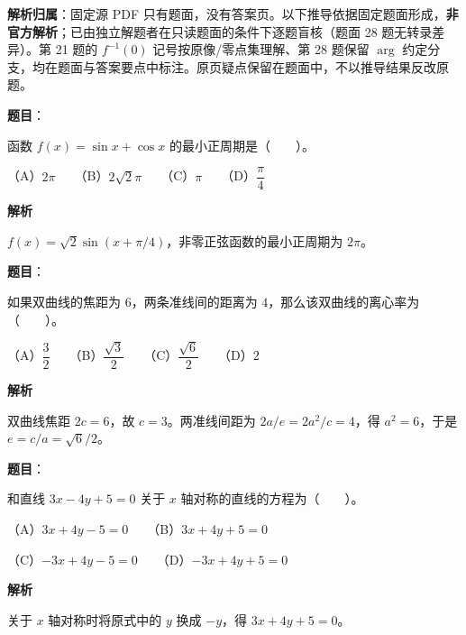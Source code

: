 

\begin{gknotice}
\textbf{解析归属}：固定源 PDF 只有题面，没有答案页。以下推导依据固定题面形成，\textbf{非官方解析}；已由独立解题者在只读题面的条件下逐题盲核（题面 28 题无转录差异）。第 21 题的 \(f^{-1}(0)\) 记号按原像/零点集理解、第 28 题保留 \(\arg\) 约定分支，均在题面与答案要点中标注。原页疑点保留在题面中，不以推导结果反改原题。
\end{gknotice}

\begin{answer}

\textbf{题目}：

函数 $f(x)=\sin x+\cos x$ 的最小正周期是\mbox{（　　）}。

（A）$2\pi$　　（B）$2\sqrt2\pi$　　（C）$\pi$　　（D）$\dfrac\pi4$

\textbf{解析}

$f(x)=\sqrt2\sin(x+\pi/4)$，非零正弦函数的最小正周期为 $2\pi$。


\end{answer}
\begin{answer}

\textbf{题目}：

如果双曲线的焦距为 $6$，两条准线间的距离为 $4$，那么该双曲线的离心率为\mbox{（　　）}。

（A）$\dfrac32$　　（B）$\dfrac{\sqrt3}{2}$　　（C）$\dfrac{\sqrt6}{2}$　　（D）$2$

\textbf{解析}

双曲线焦距 $2c=6$，故 $c=3$。两准线间距为 $2a/e=2a^2/c=4$，得 $a^2=6$，于是 $e=c/a=\sqrt6/2$。


\end{answer}
\begin{answer}

\textbf{题目}：

和直线 $3x-4y+5=0$ 关于 $x$ 轴对称的直线的方程为\mbox{（　　）}。

（A）$3x+4y-5=0$　　（B）$3x+4y+5=0$

（C）$-3x+4y-5=0$　　（D）$-3x+4y+5=0$

\textbf{解析}

关于 $x$ 轴对称时将原式中的 $y$ 换成 $-y$，得 $3x+4y+5=0$。


\end{answer}
